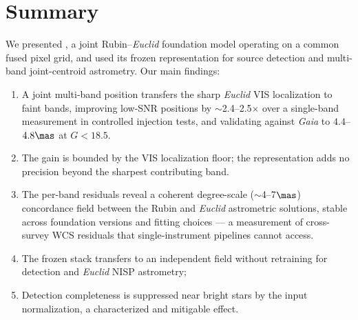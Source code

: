 \section{Summary}
\label{sec:summary}

We presented \jaisp{}, a joint Rubin--\textit{Euclid} foundation model operating
on a common fused pixel grid, and used its frozen representation for source
detection and multi-band joint-centroid astrometry. Our main findings:

\begin{enumerate}
  \item A joint multi-band position transfers the sharp \textit{Euclid} VIS
    localization to faint bands, improving low-SNR positions by
    $\sim$2.4--2.5$\times$ over a single-band measurement in controlled
    injection tests, and validating against \textit{Gaia} to $4.4$--$4.8\mas$
    at $G<18.5$.
  \item The gain is bounded by the VIS localization floor; the representation
    adds no precision beyond the sharpest contributing band.
  \item The per-band residuals reveal a coherent degree-scale ($\sim$4--7$\mas$)
    concordance field between the Rubin and \textit{Euclid} astrometric
    solutions, stable across foundation versions and fitting choices --- a
    measurement of cross-survey WCS residuals that single-instrument pipelines
    cannot access.
  \item The frozen stack transfers to an independent field without retraining
    for detection and \textit{Euclid} NISP astrometry; 
  \item Detection completeness is suppressed near bright stars by the input
    normalization, a characterized and mitigable effect.
\end{enumerate}

